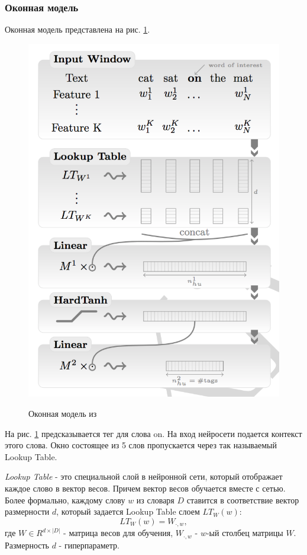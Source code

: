   \subsubsection{Оконная модель} \label{subsubsection:window}
  Оконная модель представлена на рис. \ref{figure:window_net}.
  \newpage
  \begin{figure}[!h]
    \centering
    \caption{Оконная модель из \citep{collobert2011natural}}
    \includegraphics{figures/window.png}
    \label{figure:window_net}
  \end{figure}

  На рис. \ref{figure:window_net} предсказывается тег для слова on.
  На вход нейросети подается контекст этого слова.
  Окно состоящее из 5 слов пропускается через так называемый Lookup Table.

  \textit{Lookup Table} - это специальной слой в нейронной сети, который
  отображает каждое слово в вектор весов. Причем вектор весов обучается вместе с сетью.
  Более формально, каждому слову $w$ из словаря $D$ ставится в соответствие
  вектор размерности $d$, который задается Lookup Table слоем $LT_W(w)$:
  \[
    LT_W(w) = W_{\cdot,w},
  \]
  где $W \in R^{d\times|D|}$ - матрица весов для обучения, $W_{\cdot,w}$ - $w$-ый столбец
  матрицы $W$. Размерность $d$ - гиперпараметр.


